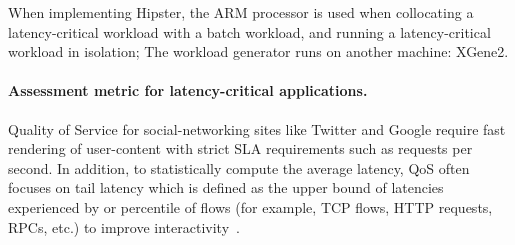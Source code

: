  When implementing Hipster, the ARM processor is used when collocating a
latency-critical workload with a batch workload, and running a latency-critical workload in
isolation; The workload generator runs on another machine: XGene2.


\begin{table}[t]
    \centering
    \caption[Latency-critical workload configuration]{ Workload configurations, maximum load while meeting the target tail latency with two big cores.} 
    \label{tab:configs}
\end{table}


\paragraph*{Assessment metric for latency-critical applications.} Quality of Service for
social-networking sites like Twitter and Google require fast rendering of user-content
with strict SLA requirements such as requests per second. In addition, to statistically
compute the average latency, QoS often focuses on tail latency which is defined as the
upper bound of latencies experienced by \ninefive or \ninenine percentile of flows (for
example, TCP flows, HTTP requests, RPCs, etc.) to improve
interactivity~\citep{Dean2013TheScale}.

